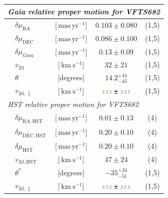 \documentclass[apjl,twocolumn]{emulateapj}
\newcommand{\SdM}[1]{{{\color{brown}{#1}}}}
\newcommand{\kms}{{\,\mathrm{km\ s^{-1}}}}
\newcommand{\masyr}{\,\mathrm{mas}\,\mathrm{yr}^{-1}}
\begin{document}
\begin{table}
\begin{center}
\begin{tabular}{llc|c|c}
                


      \multicolumn{5}{l}{\emph{Gaia relative proper motion for VFTS682 }} \\
      \hline
      &$\delta\mu_\mathrm{RA}$  &[$\masyr$] & $0.103\pm0.080$ & (1,5) \\
      &$\delta\mu_\mathrm{DEC}$  &[$\masyr$] & $0.086\pm0.100$ &  (1,5) \\
      &$\delta\mu_{Gaia}$  &[$\masyr$] & $0.13\pm0.09$ &  (1,5) \\
      &$v_\mathrm{2d}$  &[$\kms$] & $32\pm21$ & (1,5)\\  
      &$\theta$  &[degrees] &  $14.2_{-43}^{+44}$  & (1,5)\\  
      &$v_\mathrm{2d, \parallel}$  &[$\kms$] & $\SdM{xxx}\pm\SdM{xxx}$ & (1,5)\\  

 \hline     
      \multicolumn{5}{l}{\emph{HST relative proper motion for VFTS682}} \\
            \hline
      &$\delta\mu_\mathrm{RA, HST}$  &[$\masyr$] & $0.01\pm0.13$ & (4) \\
      &$\delta\mu_\mathrm{DEC, HST}$  &[$\masyr$] & $0.20\pm0.10$ &  (4) \\
       &$\delta\mu_\mathrm{HST}$  &[$\masyr$] & $0.20\pm0.10$ &  (4) \\
                  &$v_\mathrm{2d, HST}$  &[$\kms$] & $47\pm24$ & (4)\\  
                      &$\theta^{*}$  &[degrees] &   $-35_{-51}^{+24}$   & (1,5)\\  
                          &$v_\mathrm{2d, \parallel}$  &[$\kms$] & $\SdM{xxx}\pm\SdM{xxx}$ & (1,5)\\  

     
\hline



\end{tabular}
\end{center}
\end{table}
\end{document}
